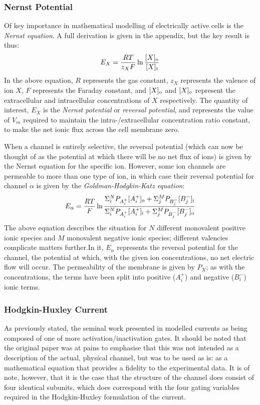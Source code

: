 \documentclass[../thesis-main.tex]{subfiles}
\begin{document}
 \subsubsection{Nernst Potential}
 \label{subsubsec:nernst}
 Of key importance in mathematical modelling of electrically active cells is the \emph{Nernst equation}. A full derivation is given in the appendix, but the key result is thus:
 \begin{equation}
  E_X = \frac{RT}{z_XF}\ln\frac{[X]_\textnormal{o}}{[X]_\textnormal{i}}
 \end{equation}
 In the above equation, $R$ represents the gas constant, $z_X$ represents the valence of ion $X$, $F$ represents the Faraday constant, and $[X]_\textnormal{o}$ and $[X]_\textnormal{o}$ represent the extracellular and intracellular concentrations of $X$ respectively. The quantity of interest, $E_X$ is the \emph{Nernst potential} or \emph{reversal potential}, and represents the value of $V_m$ required to maintain the intra-/extracellular concentration ratio constant, \idest{} to make the net ionic flux across the cell membrane zero.
 
 When a channel is entirely selective, the reversal potential (which can now be thought of as the potential at which there will be no net flux of ions) is given by the Nernst equation for the specific ion. However, some ion channels are permeable to more than one type of ion, in which case their reversal potential for channel $\alpha$ is given by the \emph{Goldman-Hodgkin-Katz equation}:
 \begin{equation}
  E_\alpha = \frac{RT}{F}\ln\frac{\Sigma_i^N P_{A_i^+}[A_i^+]_\textnormal{o} + \Sigma_j^M P_{B_j^-}[B_j^-]_\textnormal{i}}{\Sigma_i^N P_{A_i^+}[A_i^+]_\textnormal{i} + \Sigma_j^M P_{B_j^-}[B_j^-]_\textnormal{o}}
 \end{equation}
 The above equation describes the situation for $N$ different monovalent positive ionic species and $M$ monovalent negative ionic species; different valencies complicate matters further.In it, $E_\alpha$ represents the reversal potential for the channel, \idest{} the potential at which, with the given ion concentrations, no net electric flow will occur. The permeability of the membrane is given by $P_X$; as with the concentrations, the terms have been split into positive ($A_i^+$) and negative ($B_i^-$) ionic terms.
 
 \subsubsection{Hodgkin-Huxley Current}
 As previously stated, the seminal work presented in \citet{Hodgkin1952} modelled currents as being composed of one of more activation/inactivation gates. It should be noted that the original paper was at pains to emphasise that this was not intended as a description of the actual, physical channel, but was to be used as is: as a mathematical equation that provides a fidelity to the experimental data. It is of note, however, that it is the case that the structure of the \K{} channel does consist of four identical subunits, which does correspond with the four gating variables required in the Hodgkin-Huxley formulation of the current.
 
\end{document}
